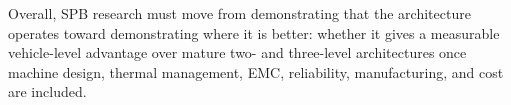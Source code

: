 Overall, SPB research must move from demonstrating that the
architecture operates toward demonstrating where it is better: whether
it gives a measurable vehicle-level advantage over mature two- and
three-level architectures once machine design, thermal management,
EMC, reliability, manufacturing, and cost are included.

